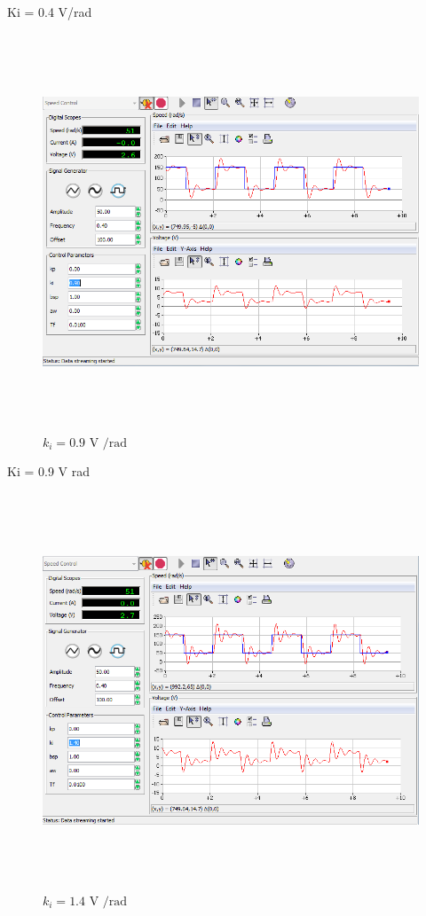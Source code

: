 \documentclass[]{article}
\begin{document}
Ki = 0.4 V/rad

\begin{figure}\includegraphics[width=6.50000in,height=4.65278in]{media/image12.png} \caption{$k_i = \text{0.9 V /rad}$} \end{figure}

Ki = 0.9 V rad

\begin{figure}\includegraphics[width=6.50000in,height=4.63889in]{media/image11.png} \caption{$k_i = \text{1.4 V /rad}$} \end{figure}
\end{document}
